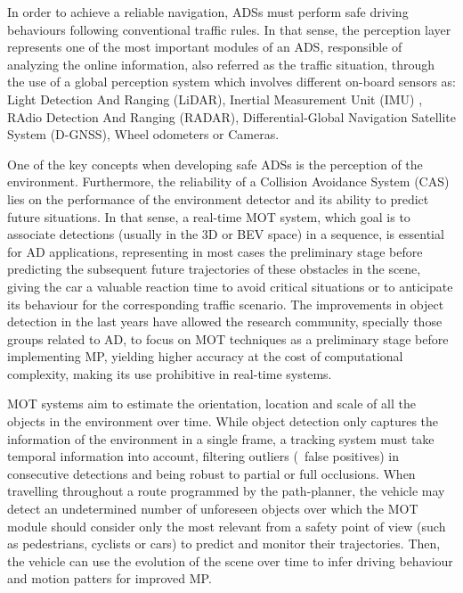 In order to achieve a reliable navigation, \acp{ADS} must perform safe driving behaviours following conventional traffic rules. In that sense, the perception layer represents one of the most important modules of an \ac{ADS}, responsible of analyzing the online information, also referred as the traffic situation, through the use of a global perception system \cite{gomez2019simulating} which involves different on-board sensors as: Light Detection And Ranging (LiDAR), Inertial Measurement Unit (IMU) , RAdio Detection And Ranging (RADAR), Differential-Global Navigation Satellite System (D-GNSS), Wheel odometers or Cameras.

One of the key concepts when developing safe \acp{ADS} is the perception of the environment. Furthermore, the reliability of a Collision Avoidance System (CAS) lies on the performance of the environment detector and its ability to predict future situations. In that sense, a real-time \ac{MOT} system, which goal is to associate detections (usually in the 3D or \ac{BEV} space) in a sequence, is essential for \ac{AD} applications, representing in most cases the preliminary stage before predicting the subsequent future trajectories of these obstacles in the scene, giving the car a valuable reaction time to avoid critical situations or to anticipate its behaviour for the corresponding traffic scenario. The improvements in object detection in the last years have allowed the research community, specially those groups related to \ac{AD}, to focus on \ac{MOT} techniques as a preliminary stage before implementing \ac{MP}, yielding higher accuracy at the cost of computational complexity, making its use prohibitive in real-time systems. 

\ac{MOT} systems aim to estimate the orientation, location and scale of all the objects in the environment over time. While object detection only captures the information of the environment in a single frame, a tracking system must take temporal information into account, filtering outliers (\aka \ false positives) in consecutive detections and being robust to partial or full occlusions. When travelling throughout a route programmed by the path-planner, the vehicle may detect an undetermined number of unforeseen objects over which the \ac{MOT} module should consider only the most relevant from a safety point of view (such as pedestrians, cyclists or cars) to predict and monitor their trajectories. Then, the vehicle can use the evolution of the scene over time to infer driving behaviour and motion patters for improved \ac{MP}.

